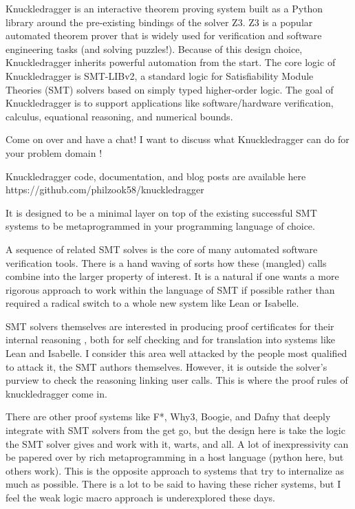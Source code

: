 \documentclass{article}%
\begin{document}
Knuckledragger is an interactive theorem proving system built as a Python library around the pre-existing bindings of the solver Z3. Z3 is a popular automated theorem prover that is widely used for verification and software engineering tasks (and solving puzzles!). Because of this design choice, Knuckledragger inherits powerful automation from the start. The core logic of Knuckledragger is SMT-LIBv2, a standard logic for Satisfiability Module Theories (SMT) solvers based on simply typed higher-order logic. The goal of Knuckledragger is to support applications like software/hardware verification, calculus, equational reasoning, and numerical bounds.

Come on over and have a chat! I want to discuss what Knuckledragger can do for your problem domain !

Knuckledragger code, documentation, and blog posts are available here https://github.com/philzook58/knuckledragger





It is designed to be a minimal layer on top of the existing successful SMT systems to be metaprogrammed in your programming language of choice.

A sequence of related SMT solves is the core of many automated software verification tools. There is a hand waving of sorts how these (mangled) calls combine into the larger property of interest. It is a natural if one wants a more rigorous approach to work within the language of SMT if possible rather than required a radical switch to a whole new system like Lean or Isabelle.

SMT solvers themselves are interested in producing proof certificates for their internal reasoning \cite{smtproofs1}, both for self checking and for translation into systems like Lean and Isabelle. I consider this area well attacked by the people most qualified to attack it, the SMT authors themselves. However, it is outside the solver’s purview to check the reasoning linking user calls. This is where the proof rules of knuckledragger come in.

There are other proof systems like F*, Why3, Boogie, and Dafny that deeply integrate with SMT solvers from the get go, but the design here is take the logic the SMT solver gives and work with it, warts, and all. A lot of inexpressivity can be papered over by rich metaprogramming in a host language (python here, but others work). This is the opposite approach to systems that try to internalize as much as possible. There is a lot to be said to having these richer systems, but I feel the weak logic macro approach is underexplored these days.
\end{document}

